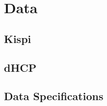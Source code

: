 \chapter{Data} \label{chap:Data}
\vspace{1cm}


\section{Kispi}



\section{dHCP}
\section{Data Specifications}
